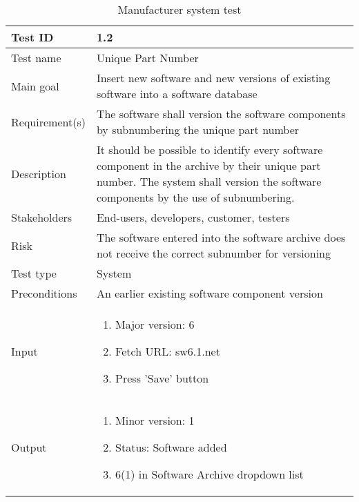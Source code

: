 \begin{table}[H]
\centering
\caption{Manufacturer system test}
\begin{tabularx}{1.0\textwidth}{
    |p{}     %
    |p{}|    %
}
\hline

Test ID
& 1.2
\\
\hline

Test name
& Unique Part Number
\\
\hline

Main goal
& Insert new software and new versions of existing software into a software database
\\
\hline

Requirement(s)
& The software shall version the software components by subnumbering the unique part number
\\
\hline

Description
& It should be possible to identify every software component in the archive by their unique part number. The system shall version the software components by the use of subnumbering. 
\\
\hline

Stakeholders
& End-users, developers, customer, testers
\\
\hline

Risk
& The software entered into the software archive does not receive the correct subnumber for versioning
\\
\hline

Test type
& System
\\
\hline

Preconditions
& An earlier existing software component version
\\
\hline

Input
& \begin{enumerate}
    \item Major version: 6
    \item Fetch URL: sw6.1.net
    \item Press 'Save' button
\end{enumerate}
\\
\hline

Output
& \begin{enumerate}
    \item Minor version: 1
    \item Status: Software added
    \item 6(1) in Software Archive dropdown list
\end{enumerate}
\\
\hline


\end{tabularx}
\end{table}
